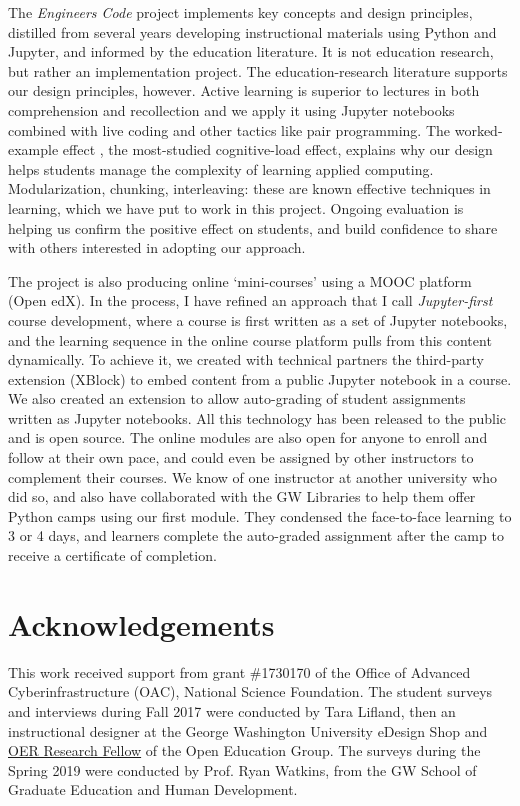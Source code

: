 \documentclass[10pt,journal,compsoc]{IEEEtran}
\begin{document}
The \emph{Engineers Code} project implements key concepts and design principles, distilled from several years developing instructional materials using Python and Jupyter, and informed by the education literature.  
It is not education research, but rather an implementation project. 
The education-research literature supports our design principles, however.
Active learning is superior to lectures in both comprehension and recollection \cite{freeman2014active} and we apply it using Jupyter notebooks combined with live coding and other tactics like pair programming. 
The worked-example effect \cite{chen2015worked}, the most-studied cognitive-load effect, explains why our design helps students manage the complexity of learning applied computing.
Modularization, chunking, interleaving: these are known effective techniques in learning, which we have put to work in this project. 
Ongoing evaluation is helping us confirm the positive effect on students, and build confidence to share with others interested in adopting our approach. 

The project is also producing online `mini-courses' using a MOOC platform (Open edX).
In the process, I have refined an approach that I call \emph{Jupyter-first} course development, where a course is first written as a set of Jupyter notebooks, and the learning sequence in the online course platform pulls from this content dynamically. 
To achieve it, we created with technical partners the third-party extension (XBlock) to embed content from a public Jupyter notebook in a course.
We also created an extension to allow auto-grading of student assignments written as Jupyter notebooks. 
All this technology has been released to the public and is open source. 
The online modules are also open for anyone to enroll and follow at their own pace, and could even be assigned by other instructors to complement their courses. 
We know of one instructor at another university who did so, and also have collaborated with the GW Libraries to help them offer Python camps using our first module. 
They condensed the face-to-face learning to 3 or 4 days, and learners complete the auto-graded assignment after the camp to receive a certificate of completion.

\section*{Acknowledgements}

This work received support from grant \#1730170  of the Office of Advanced Cyberinfrastructure (OAC), National Science Foundation. 
The student surveys and interviews during Fall 2017 were conducted by Tara Lifland, then an instructional designer at the  George Washington University eDesign Shop and \href{http://openedgroup.org/fellowship}{OER Research Fellow} of the Open Education Group. 
The surveys during the Spring 2019 were conducted by Prof. Ryan Watkins, from the GW School of Graduate Education and Human Development. 
\end{document}
